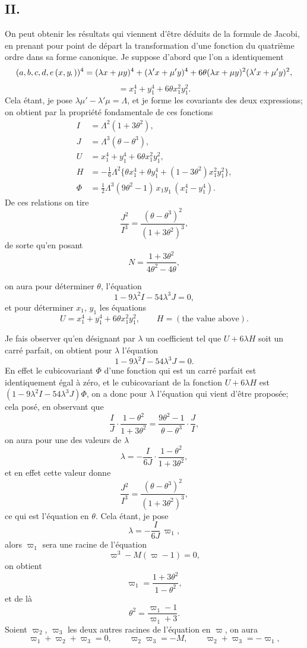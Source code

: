 \documentclass[11pt,a4paper]{article}
\newcommand{\fcn}[2]{(#1\kern-1pt, #2)}
\begin{document}
\subsection*{II.}

On peut obtenir les r\'esultats qui viennent d'\^etre d\'eduits de la formule de
Jacobi, en prenant pour point de d\'epart la transformation d'une fonction du
quatri\`eme ordre dans sa forme canonique. Je suppose d'abord que l'on a
identiquement
\[
(a,b,c,d,e\,\fcn{x,y})^4 = (\lambda x + \mu y)^4 + (\lambda' x + \mu' y)^4 + 6\theta(\lambda x + \mu y)^2(\lambda' x + \mu' y)^2,
\]
\[
= x_1^4 + y_1^4 + 6\theta x_1^2 y_1^2.
\]
Cela \'etant, je pose $\lambda\mu' - \lambda'\mu = \Lambda$, et je forme les
covariants des deux expressions; on obtient par la propri\'et\'e fondamentale
de ces fonctions
\begin{align*}
I &= \Lambda^2(1 + 3\theta^2),\\
J &= \Lambda^3(\theta - \theta^3),\\
U &= x_1^4 + y_1^4 + 6\theta x_1^2 y_1^2,\\
H &= -\tfrac{1}{6}\Lambda^2\big\{\theta x_1^4 + \theta y_1^4 + (1 - 3\theta^2) x_1^2 y_1^2\big\},\\
\Phi &= \tfrac{1}{2}\Lambda^3(9\theta^2 - 1)\,x_1 y_1\,(x_1^4 - y_1^4).
\end{align*}
De ces relations on tire
\[
\frac{J^2}{I^3} = \frac{(\theta - \theta^3)^2}{(1 + 3\theta^2)^3},
\]
de sorte qu'en posant
\[
N = \frac{1 + 3\theta^2}{4\theta^2 - 4\theta},
\]

\setcounter{page}{65}

on aura pour d\'eterminer $\theta$, l'\'equation
\[
1 - 9\lambda^2 I - 54 \lambda^3 J = 0,
\]
et pour d\'eterminer $x_1$, $y_1$ les \'equations
\[
U = x_1^4 + y_1^4 + 6\theta x_1^2 y_1^2, \qquad
H = (\text{the value above}).
\]

Je fais observer qu'en d\'esignant par $\lambda$ un coefficient tel que $U + 6\lambda H$
soit un carr\'e parfait, on obtient pour $\lambda$ l'\'equation
\[
1 - 9 \lambda^2 I - 54 \lambda^3 J = 0.
\]
En effet le cubicovariant $\Phi$ d'une fonction qui est un carr\'e parfait est
identiquement \'egal \`a z\'ero, et le cubicovariant de la fonction $U + 6\lambda H$
est $(1 - 9\lambda^2 I - 54\lambda^3 J)\Phi$, on a donc pour $\lambda$ l'\'equation
qui vient d'\^etre propos\'ee; cela pos\'e, en observant que
\[
\frac{I}{J}\cdot\frac{1 - \theta^2}{1 + 3\theta^2} = \frac{9\theta^2 - 1}{\theta - \theta^3}\cdot\frac{J}{I},
\]
on aura pour une des valeurs de $\lambda$
\[
\lambda = -\frac{I}{6J}\cdot\frac{1 - \theta^2}{1 + 3\theta^2},
\]
et en effet cette valeur donne
\[
\frac{J^2}{I^3} = \frac{(\theta - \theta^3)^2}{(1 + 3\theta^2)^3},
\]
ce qui est l'\'equation en $\theta$. Cela \'etant, je pose
\[
\lambda = -\frac{I}{6J}\,\varpi_1,
\]
alors $\varpi_1$ sera une racine de l'\'equation
\[
\varpi^3 - M(\varpi - 1) = 0,
\]
on obtient
\[
\varpi_1 = \frac{1 + 3\theta^2}{1 - \theta^2},
\]
et de l\`a
\[
\theta^2 = \frac{\varpi_1 - 1}{\varpi_1 + 3}.
\]
Soient $\varpi_2$, $\varpi_3$ les deux autres racines de l'\'equation en $\varpi$, on
aura
\[
\varpi_1 + \varpi_2 + \varpi_3 = 0, \qquad
\varpi_2\varpi_3 = -M, \qquad \varpi_2 + \varpi_3 = -\varpi_1,
\]
\end{document}
